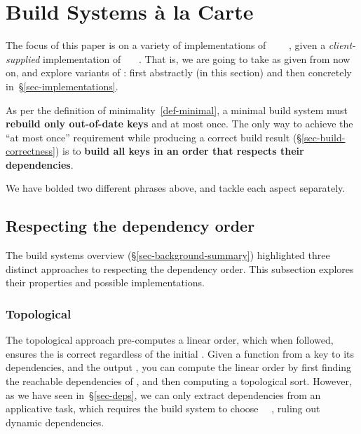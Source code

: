 \section{Build Systems \`a la Carte}\label{sec-build}

The focus of this paper is on a variety of implementations of
~~~~, given
a \emph{client-supplied} implementation of ~~~. That
is, we are going to take  as given from now on, and explore variants of
: first abstractly (in this section) and then concretely
in~\S\ref{sec-implementations}.

As per the definition of minimality~\ref{def-minimal}, a minimal build
system must \textbf{rebuild only out-of-date keys} and at most once. The only
way to achieve the ``at most once'' requirement while producing a correct build
result (\S\ref{sec-build-correctness}) is to \textbf{build all keys in an
order that respects their dependencies}.

\vspace{1mm}
We have bolded two different phrases above, and tackle each aspect separately.

\subsection{Respecting the dependency order}
\label{sec-dependency-orderings}

The build systems overview (\S\ref{sec-background-summary}) highlighted three
distinct approaches to respecting the dependency order. This subsection explores
their properties and possible implementations.

\subsubsection{Topological}\label{sec-topological}

The topological approach pre-computes a linear order, which when followed, ensures
the  is correct regardless of the initial . Given a function
from a key to its dependencies, and the output , you can compute the
linear order by first finding the reachable dependencies of ,
and then computing a topological sort. However, as we have seen
in~\S\ref{sec-deps}, we can only extract dependencies from an applicative task,
which requires the build system to choose ~\hs{=}~, ruling
out dynamic dependencies.

